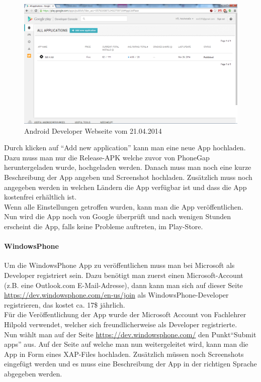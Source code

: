 \begin{figure}[H]
\centering
\includegraphics[keepaspectratio=true, width=14cm]{images/appstores/AndroidDeveloper2.png}
\caption{Android Developer Webseite vom 21.04.2014}
\end{figure}

Durch klicken auf \enquote{Add new application} kann man eine neue App hochladen. Dazu muss man nur die Release-APK welche zuvor von PhoneGap heruntergeladen wurde, hochgeladen werden. Danach muss man noch eine kurze Beschreibung der App angeben und Screenshot hochladen. Zusätzlich muss noch angegeben werden in welchen Ländern die App verfügbar ist und dass die App kostenfrei erhältlich ist.\\
Wenn alle Einstellungen getroffen wurden, kann man die App veröffentlichen. Nun wird die App noch von Google überprüft und nach wenigen Stunden erscheint die App, falls keine Probleme auftreten, im Play-Store.\\

\paragraph{WindowsPhone\\}

Um die WindowsPhone App zu veröffentlichen muss man bei Microsoft als Developer registriert sein. Dazu benötigt man zuerst einen Microsoft-Account (z.B. eine Outlook.com E-Mail-Adresse), dann kann man sich auf dieser Seite \href{https://dev.windowsphone.com/en-us/join}{https://dev.windowsphone.com/en-us/join}  als WindowsPhone-Developer registrieren, das kostet ca. 17\$ jährlich.\\
Für die Veröffentlichung der App wurde der Microsoft Account von Fachlehrer Hilpold verwendet, welcher sich freundlicherweise als Developer registrierte.\\
Nun wählt man auf der Seite \href{https://dev.windowsphone.com/}{https://dev.windowsphone.com/} den Punkt\enquote{Submit apps} aus. Auf der Seite auf welche man nun weitergeleitet wird, kann man die App in Form eines XAP-Files hochladen. Zusätzlich müssen noch Screenshots eingefügt werden und es muss eine Beschreibung der App in der richtigen Sprache abgegeben werden.\\

